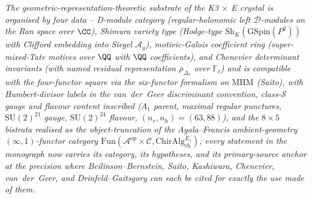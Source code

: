 \emph{The geometric-representation-theoretic substrate of the K3
$\times$ E crystal is organised by four data -- D-module category
(regular-holonomic left $\mathcal{D}$-modules on the Ran space over
$\CC$), Shimura variety type (Hodge-type $\mathrm{Sh}_K(\mathrm{GSpin}
(P^2))$ with Clifford embedding into Siegel $\mathcal{A}_g$),
motivic-Galois coefficient ring (super-mixed-Tate motives over $\QQ$
with $\QQ$ coefficients), and Chenevier determinant invariants
(with named residual representation $\overline{\rho}_{\Delta_5}$ over
$\mathbb{F}_\ell$) and is compatible with the
four-functor square via the six-functor formalism on $\mathrm{MHM}$
(Saito), with Humbert-divisor labels in the van~der~Geer
discriminant convention, class-$\mathcal{S}$ gauge and flavour
content inscribed ($A_1$ parent, maximal regular punctures,
$\mathrm{SU}(2)^{21}$ gauge, $\mathrm{SU}(2)^{24}$ flavour,
$(n_v, n_h) = (63, 88)$), and the $8\times 5$ bistrata realised as
the object-truncation of the Ayala--Francis ambient-geometry $(\infty,
1)$-functor category $\mathrm{Fun}(\mathcal{A}^{\mathrm{op}} \times
\mathcal{C}, \mathrm{ChirAlg}^{E_1}_{\mathrm{ch}})$; every statement
in the monograph now carries its category, its hypotheses, and its
primary-source anchor at the precision where Beilinson--Bernstein,
Saito, Kashiwara, Chenevier, van~der~Geer, and Drinfeld--Gaitsgory
can each be cited for exactly the use made of them.}

